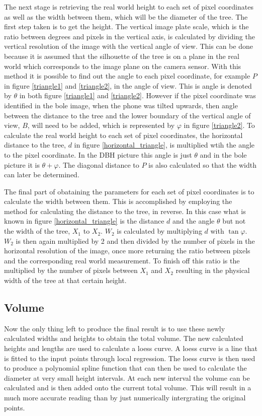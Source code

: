 The next stage is retrieving the real world height to each set of pixel coordinates as well as the width between them, which will be the diameter of the tree. The first step taken is to get the height. The vertical image plate scale, which is the ratio between degrees and pixels in the vertical axis, is calculated by dividing the vertical resolution of the image with the vertical angle of view. This can be done because it is assumed that the silhouette of the tree is on a plane in the real world which corresponds to the image plane on the camera sensor. With this method it is possible to find out the angle to each pixel coordinate, for example $P$ in figure \ref{triangle1} and \ref{triangle2}, in the angle of view. This is angle is denoted by $\theta$ in both figure \ref{triangle1} and \ref{triangle2}. However if the pixel coordinate was identified in the bole image, when the phone was tilted upwards, then angle between the distance to the tree and the lower boundary of the vertical angle of view, $B$, will need to be added, which is represented by $\varphi$ in figure \ref{triangle2}. To calculate the real world height to each set of pixel coordinates, the horizontal distance to the tree, $d$ in figure \ref{horizontal_triangle}, is multiplied wtih the angle to the pixel coordinate. In the DBH picture this angle is just $\theta$ and in the bole picture it is $\theta + \varphi$. The diagonal distance to $P$ is also calculated so that the width can later be determined.

The final part of obataining the parameters for each set of pixel coordinates is to calculate the width between them. This is accomplished by employing the method for calculating the distance to the tree, in reverse. In this case what is known in figure \ref{horizontal_triangle} is the distance $d$ and the angle $\theta$ but not the width of the tree, $X_1$ to $X_2$. $W_2$ is calculated by multiplying $d$ with $\tan{\varphi}$. $W_2$ is then again multiplied by 2 and then divided by the number of pixels in the horizontal resolution of the image, once more returning the ratio between pixels and the corresponding real world measurement. To finish off this ratio is the multiplied by the number of pixels between $X_1$ and $X_2$ resulting in the physical width of the tree at that certain height.


\subsection{Volume}
Now the only thing left to produce the final result is to use these newly calculated widths and heights to obtain the total volume. The new calculated heights and lengths are used to calculate a loess curve. A loess curve is a line that is fitted to the input points through local regression. The loess curve is then used to produce a polynomial spline function that can then be used to calculate the diameter at very small height intervals. At each new interval the volume can be calculated and is then added onto the current total volume. This will result in a much more accurate reading than by just numerically intergrating the original points.

